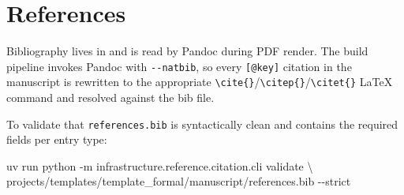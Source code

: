\documentclass[
  english,
]{article}
\newenvironment{Shaded}{}{}
\newcommand{\AttributeTok}[1]{\textcolor[rgb]{0.49,0.56,0.16}{#1}}
\newcommand{\DataTypeTok}[1]{\textcolor[rgb]{0.56,0.13,0.00}{#1}}
\newcommand{\ExtensionTok}[1]{#1}
\newcommand{\NormalTok}[1]{#1}
\theoremstyle{definition}
\begin{document}
\newpage

\section{References}\label{sec:references}

Bibliography lives in
\href{references.bib}{} and is read by
Pandoc during PDF render. The build pipeline invokes Pandoc with
\texttt{-\/-natbib}, so every \texttt{{[}@key{]}} citation in the
manuscript is rewritten to the appropriate
\texttt{\textbackslash{}cite\{\}}/\texttt{\textbackslash{}citep\{\}}/\texttt{\textbackslash{}citet\{\}}
LaTeX command and resolved against the bib file.

To validate that \texttt{references.bib} is syntactically clean and
contains the required fields per entry type:

\begin{Shaded}
\begin{Highlighting}[]
\ExtensionTok{uv}\NormalTok{ run python }\AttributeTok{{-}m}\NormalTok{ infrastructure.reference.citation.cli validate }\DataTypeTok{\textbackslash{}}
\NormalTok{    projects/templates/template\_formal/manuscript/references.bib }\AttributeTok{{-}{-}strict}
\end{Highlighting}
\end{Shaded}




\clearpage


\end{document}
